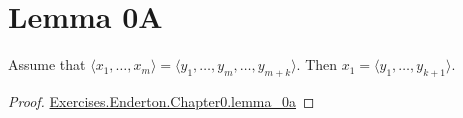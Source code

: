 \documentclass{article}
\newcommand{\ns}{Exercises.Enderton.Chapter0}
\newcommand{\link}[1]{\href{../Chapter0.html\#\ns.#1}{\ns.#1}}
\begin{document}
\section*{Lemma 0A}%
\label{sec:lemma-0a}

Assume that $\langle x_1, \ldots, x_m \rangle = \langle y_1, \ldots, y_m, \ldots, y_{m+k} \rangle$.
Then $x_1 = \langle y_1, \ldots, y_{k+1} \rangle$.

\begin{proof}

  \link{lemma\_0a}

\end{proof}
\end{document}
